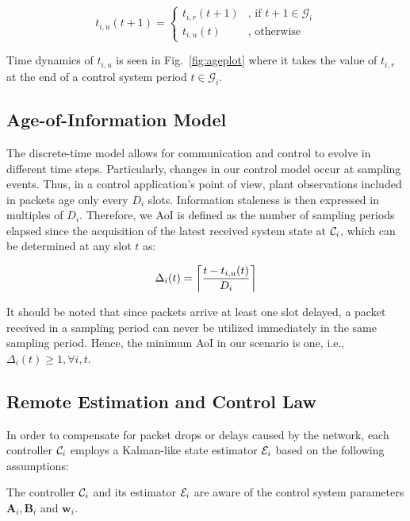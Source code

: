 \begin{equation}
  \label{eq:t_u}
  t_{i, u}(t+1) =
  \begin{cases}
  t_{i, r}(t+1) & \text{, if } t+1 \in \mathcal{G}_i \\ 
  t_{i, u}(t) & \text{, otherwise}	
  \end{cases} 
\end{equation}

Time dynamics of $t_{i,u}$ is seen in Fig.~\ref{fig:ageplot} where it takes the
value of $t_{i,r}$ at the end of a control system period $t \in \mathcal{G}_i$.

\subsection{Age-of-Information Model}
The discrete-time model allows for communication and control to evolve in
different time steps. Particularly, changes in our control model occur at
sampling events. Thus, in a control application's point of view, plant
observations included in packets age only every $D_i$ slots. Information
staleness is then expressed in multiples of $D_i$. Therefore, we AoI is defined
as the number of sampling periods elapsed since the acquisition of the latest
received system state at $\mathcal{C}_i$, which can be determined at any slot $t$
as:

\begin{equation}
  \label{eq:aoi}
  \Delta_i(t) = \left\lceil \dfrac{t - t_{i,u}(t)}{D_{i}} \right\rceil 
\end{equation}

It should be noted that since packets arrive at least one slot delayed, a packet
received in a sampling period can never be utilized immediately in the same
sampling period. Hence, the minimum AoI in our scenario is one, i.e.,
$\Delta_i(t) \ge 1,\forall i,t$.

\subsection{Remote Estimation and Control Law}
In order to compensate for packet drops or delays caused by the network, each
controller $\mathcal{C}_i$ employs a Kalman-like state estimator $\mathcal{E}_i$
based on the following assumptions:

\begin{theorem}
  The controller $\mathcal{C}_i$ and its estimator $\mathcal{E}_i$ are aware of the
  control system parameters $\boldsymbol{A}_i, \boldsymbol{B}_i$ and
  $\boldsymbol{w}_i$.
\end{theorem}

